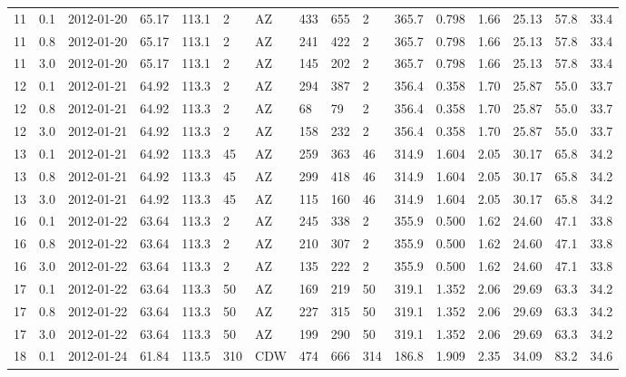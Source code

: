 {{\begin{landscape}
\begin{longtable}{llllllllllllllll}
11 & 0.1 & 2012-01-20 & \textminus{}65.17 & 113.1 & 2 & AZ & 433 & 655 & 2 & 365.7 & \textminus{}0.798 & 1.66 & 25.13 & 57.8 & 33.4\\
11 & 0.8 & 2012-01-20 & \textminus{}65.17 & 113.1 & 2 & AZ & 241 & 422 & 2 & 365.7 & \textminus{}0.798 & 1.66 & 25.13 & 57.8 & 33.4\\
11 & 3.0 & 2012-01-20 & \textminus{}65.17 & 113.1 & 2 & AZ & 145 & 202 & 2 & 365.7 & \textminus{}0.798 & 1.66 & 25.13 & 57.8 & 33.4\\
12 & 0.1 & 2012-01-21 & \textminus{}64.92 & 113.3 & 2 & AZ & 294 & 387 & 2 & 356.4 & \textminus{}0.358 & 1.70 & 25.87 & 55.0 & 33.7\\
12 & 0.8 & 2012-01-21 & \textminus{}64.92 & 113.3 & 2 & AZ & 68 & 79 & 2 & 356.4 & \textminus{}0.358 & 1.70 & 25.87 & 55.0 & 33.7\\
12 & 3.0 & 2012-01-21 & \textminus{}64.92 & 113.3 & 2 & AZ & 158 & 232 & 2 & 356.4 & \textminus{}0.358 & 1.70 & 25.87 & 55.0 & 33.7\\
13 & 0.1 & 2012-01-21 & \textminus{}64.92 & 113.3 & 45 & AZ & 259 & 363 & 46 & 314.9 & \textminus{}1.604 & 2.05 & 30.17 & 65.8 & 34.2\\
13 & 0.8 & 2012-01-21 & \textminus{}64.92 & 113.3 & 45 & AZ & 299 & 418 & 46 & 314.9 & \textminus{}1.604 & 2.05 & 30.17 & 65.8 & 34.2\\
13 & 3.0 & 2012-01-21 & \textminus{}64.92 & 113.3 & 45 & AZ & 115 & 160 & 46 & 314.9 & \textminus{}1.604 & 2.05 & 30.17 & 65.8 & 34.2\\
16 & 0.1 & 2012-01-22 & \textminus{}63.64 & 113.3 & 2 & AZ & 245 & 338 & 2 & 355.9 & 0.500 & 1.62 & 24.60 & 47.1 & 33.8\\
16 & 0.8 & 2012-01-22 & \textminus{}63.64 & 113.3 & 2 & AZ & 210 & 307 & 2 & 355.9 & 0.500 & 1.62 & 24.60 & 47.1 & 33.8\\
16 & 3.0 & 2012-01-22 & \textminus{}63.64 & 113.3 & 2 & AZ & 135 & 222 & 2 & 355.9 & 0.500 & 1.62 & 24.60 & 47.1 & 33.8\\
17 & 0.1 & 2012-01-22 & \textminus{}63.64 & 113.3 & 50 & AZ & 169 & 219 & 50 & 319.1 & \textminus{}1.352 & 2.06 & 29.69 & 63.3 & 34.2\\
17 & 0.8 & 2012-01-22 & \textminus{}63.64 & 113.3 & 50 & AZ & 227 & 315 & 50 & 319.1 & \textminus{}1.352 & 2.06 & 29.69 & 63.3 & 34.2\\
17 & 3.0 & 2012-01-22 & \textminus{}63.64 & 113.3 & 50 & AZ & 199 & 290 & 50 & 319.1 & \textminus{}1.352 & 2.06 & 29.69 & 63.3 & 34.2\\
18 & 0.1 & 2012-01-24 & \textminus{}61.84 & 113.5 & 310 & CDW & 474 & 666 & 314 & 186.8 & 1.909 & 2.35 & 34.09 & 83.2 & 34.6\\

\end{longtable}
\end{landscape}}}
